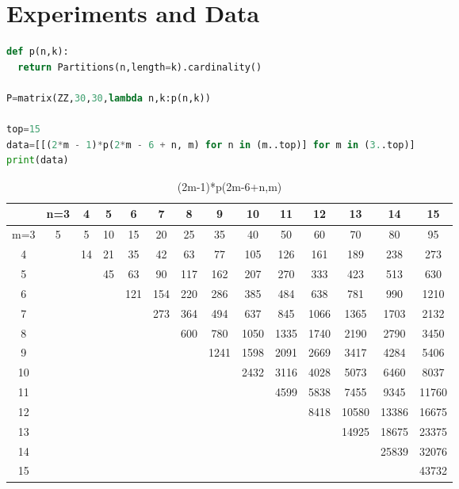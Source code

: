 \documentclass[12pt]{article}
\begin{document}
\section{Experiments and Data}

\begin{lstlisting}[language=Python]
def p(n,k):
  return Partitions(n,length=k).cardinality()

P=matrix(ZZ,30,30,lambda n,k:p(n,k))

top=15
data=[[(2*m - 1)*p(2*m - 6 + n, m) for n in (m..top)] for m in (3..top)]
print(data)
\end{lstlisting}

\begin{table}[]
  \caption{(2m-1)*p(2m-6+n,m)}
  \label{tab:FCdata15}
\begin{center}
\begin{tabular}{||c c c c c c c c c c c c c c||}
  \text{} & n=3 & 4 & 5 & 6 & 7 & 8 & 9 & 10 & 11 & 12 & 13 & 14 & 15 \\
  \hline
  m=3 & 5 & 5 & 10 & 15 & 20 & 25 & 35 & 40 & 50 & 60 & 70 & 80 & 95 \\
  4 & \text{} & 14 & 21 & 35 & 42 & 63 & 77 & 105 & 126 & 161 & 189 & 238 & 273 \\
  5 & \text{} & \text{} & 45 & 63 & 90 & 117 & 162 & 207 & 270 & 333 & 423 & 513 & 630 \\
  6 & \text{} & \text{} & \text{} & 121 & 154 & 220 & 286 & 385 & 484 & 638 & 781 & 990 & 1210 \\
  7 & \text{} & \text{} & \text{} & \text{}  & 273 & 364 & 494 & 637 & 845 & 1066 & 1365 & 1703 & 2132  \\
  8 & \text{} & \text{} & \text{} & \text{} & \text{} & 600 & 780 & 1050 & 1335 & 1740 & 2190 & 2790 & 3450 \\
  9 & \text{} & \text{} & \text{} & \text{} & \text{} & \text{} & 1241 & 1598 & 2091 & 2669 & 3417 & 4284 & 5406 \\
  10 & \text{} & \text{} & \text{} & \text{} & \text{} & \text{} & \text{} & 2432 & 3116 & 4028 & 5073 & 6460 & 8037 \\
  11 & \text{} & \text{} & \text{} & \text{} & \text{} & \text{} & \text{} & \text{} & 4599 & 5838 & 7455 & 9345 & 11760  \\
  12 & \text{} & \text{} & \text{} & \text{} & \text{} & \text{} & \text{} & \text{} & \text{} & 8418 & 10580 & 13386 & 16675 \\
  13 & \text{} & \text{} & \text{} & \text{} & \text{} & \text{} & \text{} & \text{} & \text{} & \text{} & 14925 & 18675 & 23375 \\
  14 & \text{} & \text{} & \text{} & \text{} & \text{} & \text{} & \text{} & \text{} & \text{} & \text{} & \text{} & 25839 & 32076 \\
  15 & \text{} & \text{} & \text{} & \text{} & \text{} & \text{} & \text{} & \text{} & \text{} & \text{} & \text{} & \text{} & 43732 \\
\end{tabular}
\end{center}
\end{table}
\end{document}
